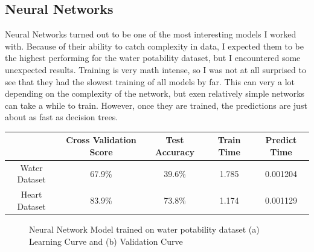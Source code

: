 \documentclass[
	letterpaper, %
]{mlreport}
\begin{document}
\subsection{Neural Networks}
Neural Networks turned out to be one of the most interesting models I worked with. Because of their ability to catch complexity in data, I expected them to be the highest performing for the water potability dataset, but I encountered some unexpected results. Training is very math intense, so I was not at all surprised to see that they had the slowest training of all models by far. This can very a lot depending on the complexity of the network, but exen relatively simple networks can take a while to train. However, once they are trained, the predictions are just about as fast as decision trees.

\begin{center}
	\begin{tabular}{|c||c|c|c|c|}
	 \hline
	  & Cross Validation Score & Test Accuracy & Train Time & Predict Time \\
	 \hline\hline
	 Water Dataset & 67.9\%  & 39.6\% & 1.785 & 0.001204 \\
	 \hline
	 Heart Dataset & 83.9\%  & 73.8\% & 1.174 & 0.001129 \\
	 \hline
	\end{tabular}
	\label{table:table3}
\end{center}
\begin{figure}
	\centering
	\caption{Neural Network Model trained on water potability dataset (a) Learning Curve and (b) Validation Curve}
	\label{fig:fig7}
\end{figure}
\end{document}
